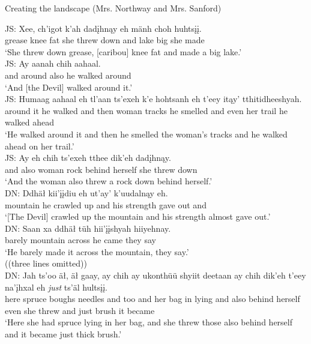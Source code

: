 \begin{exe}
\ex Creating the landscape (Mrs. Northway and Mrs. Sanford) \label{brucks:JS-DN-create-landscape}
\begin{xlist}

\ex \gll JS: Xee, ch'igot k'ah dadįhnąy eh mänh choh huhtsįį.  \\
 { } grease knee fat {she threw down} and lake big {she made} \\
\glt `She threw down grease, [caribou] knee fat and made a big lake.' \\

\ex \gll JS: Ay aanah chih aahaal.  \\
 { } and around also {he walked around} \\
\glt `And [the Devil] walked around it.' \\

\ex \gll JS: Humaag aahaal eh tl'aan ts'exeh k'e hohtsanh eh t'eey itąy' tthitidheeshyah.  \\
 { } {around it} {he walked} and then woman tracks {he smelled} and even {her trail} {he walked ahead} \\
\glt `He walked around it and then he smelled the woman's tracks and he walked ahead on her trail.' \\

\ex \gll JS: {Ay eh} chih ts'exeh tthee dik'eh dadįhnąy.  \\
 { } and also woman rock {behind herself} {she threw down} \\
\glt `And the woman also threw a rock down behind herself.' \\

\ex \gll DN: Ddhäł kii'įįdiu eh ut'ay' k'uudalnąy eh.  \\
 { } mountain {he crawled up} and {his strength} {gave out} and \\
\glt `[The Devil] crawled up the mountain and his strength almost gave out.' \\

\ex \gll DN: {Saan xa} ddhäł tüh hii'įįshyah hiiyehnay.  \\
 { } barely mountain across {he came} {they say} \\
\glt `He barely made it across the mountain, they say.' \\

\sn ((three lines omitted))\\

\ex \gll DN: Jah ts'oo äł, {äł gaay}, ay chih ay ukonthüü shyiit deetaan ay chih dik'eh t'eey na'įhxal eh {\em just} ts'äl hultsįį.  \\
 { } here spruce boughs needles and too and {her bag} in lying and also {behind herself} even {she threw} and just brush {it became} \\
\glt `Here she had spruce lying in her bag, and she threw those also behind herself and it became just thick brush.' \\


\end{xlist}
\end{exe}
